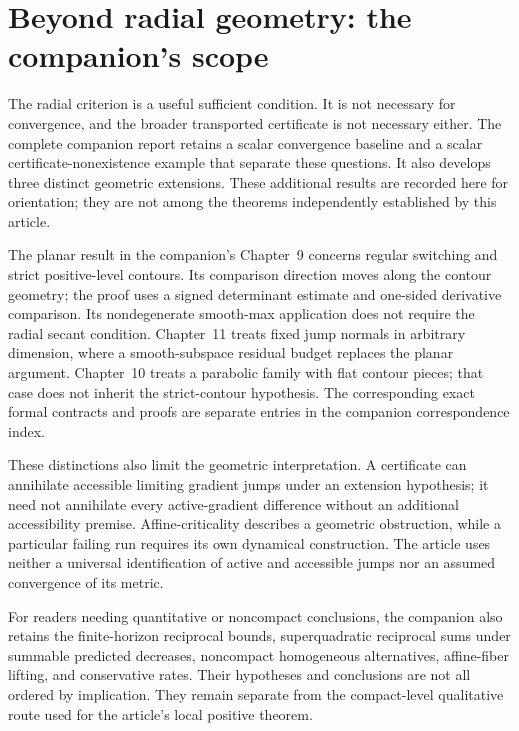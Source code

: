 \section{Beyond radial geometry: the companion's scope}\label{art:beyond}

The radial criterion is a useful sufficient condition. It is not necessary
for convergence, and the broader transported certificate is not necessary
either. The complete companion report retains a scalar convergence baseline
and a scalar certificate-nonexistence example that separate these questions.
It also develops three distinct geometric extensions. These additional
results are recorded here for orientation; they are not among the theorems
independently established by this article.

The planar result in the companion's Chapter~9 concerns regular switching
and strict positive-level contours. Its comparison direction moves along
the contour geometry; the proof uses a signed determinant estimate and
one-sided derivative comparison. Its nondegenerate smooth-max application
does not require the radial secant condition. Chapter~11 treats fixed jump
normals in arbitrary dimension, where a smooth-subspace residual budget
replaces the planar argument. Chapter~10 treats a parabolic family with
flat contour pieces; that case does not inherit the strict-contour hypothesis.
The corresponding exact formal contracts and proofs are separate entries in
the companion correspondence index.

These distinctions also limit the geometric interpretation. A certificate
can annihilate accessible limiting gradient jumps under an extension
hypothesis; it need not annihilate every active-gradient difference without
an additional accessibility premise. Affine-criticality describes a geometric
obstruction, while a particular failing run requires its own dynamical
construction. The article uses neither a universal identification of active
and accessible jumps nor an assumed convergence of its metric.

For readers needing quantitative or noncompact conclusions, the companion
also retains the finite-horizon reciprocal bounds, superquadratic reciprocal
sums under summable predicted decreases, noncompact homogeneous alternatives,
affine-fiber lifting, and conservative rates. Their hypotheses and conclusions
are not all ordered by implication. They remain separate from the compact-level
qualitative route used for the article's local positive theorem.
